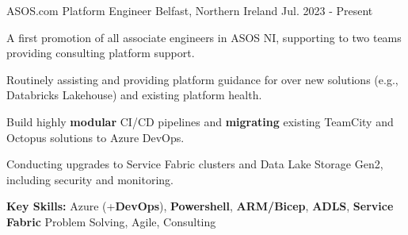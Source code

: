 \begin{cventries}

  \cventry
  	{ASOS.com} %
    {Platform Engineer} %
    {Belfast, Northern Ireland} %
    {Jul. 2023 - Present} %
    {
    \begin{cvitems}
		\item {A first promotion of all associate engineers in ASOS NI, supporting to two teams providing consulting platform support.}
		\item {Routinely assisting and providing platform guidance for over new solutions (e.g., Databricks Lakehouse) and existing platform health.}
		\item {Build highly \textbf{modular} CI/CD pipelines and \textbf{migrating} existing TeamCity and Octopus solutions to Azure DevOps.}
    \item {Conducting upgrades to Service Fabric clusters and Data Lake Storage Gen2, including security and monitoring.}
      \item {\textbf{Key Skills:} Azure (+\textbf{DevOps}), \textbf{Powershell}, \textbf{ARM/Bicep}, \textbf{ADLS}, \textbf{Service Fabric} Problem Solving, Agile, Consulting}
     \end{cvitems}
    }


\end{cventries}
